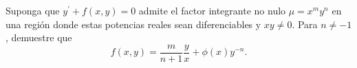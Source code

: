 Suponga que $y^{\prime}+f(x,y)=0$ admite el factor integrante no nulo $\mu=x^my^n$ en una región donde estas potencias reales sean diferenciables y $xy\ne0$. Para $n\ne-1$, demuestre que\[f(x,y)=\frac{m}{n+1}\frac yx+\phi(x)y^{-n}.\]
